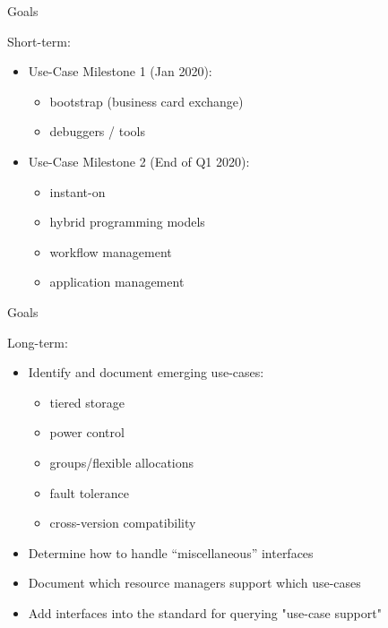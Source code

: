 \documentclass[presentation]{beamer}
\begin{document}
\begin{frame}[label={sec:org772bbd6}]{Goals}
\begin{block}{Short-term:}
\begin{itemize}
\item Use-Case Milestone 1 (Jan 2020):
\begin{itemize}
\item bootstrap (business card exchange)
\item debuggers / tools
\end{itemize}
\item Use-Case Milestone 2 (End of Q1 2020):
\begin{itemize}
\item instant-on
\item hybrid programming models
\item workflow management
\item application management
\end{itemize}
\end{itemize}
\end{block}
\end{frame}
\begin{frame}[label={sec:orgaeb1095}]{Goals}
\begin{block}{Long-term:}
\begin{itemize}
\item Identify and document emerging use-cases:
\begin{itemize}
\item tiered storage
\item power control
\item groups/flexible allocations
\item fault tolerance
\item cross-version compatibility
\end{itemize}
\item Determine how to handle “miscellaneous” interfaces
\item Document which resource managers support which use-cases
\item Add interfaces into the standard for querying "use-case support"
\end{itemize}
\end{block}
\end{frame}
\end{document}
